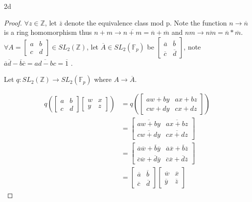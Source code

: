 \documentclass{article}
\newcommand{\Z}{\mathbb{Z}}
\newcommand{\F}{\mathbb{F}}
\begin{document}
\begin{PROB}{2d}\label{Problem 2d.}
    
\end{PROB}
\begin{proof}
    $\forall z \in \Z$, let $\overline{z}$ denote the equivalence class mod p. Note the function $n \to \overline{n}$ is a ring homomorphism thus $n + m \to \overline{n + m} = \overline{n} + \overline{m}$ and $nm \to \overline{nm} = \overline{n} * \overline{m}$. $\forall A = \begin{bmatrix}
        a & b \\ c & d
    \end{bmatrix} \in SL_2(\Z)$, let $\overline{A} \in SL_2(\F_p)$ be $\begin{bmatrix}
        \overline{a} & \overline{b} \\ \overline{c} & \overline{d}
    \end{bmatrix}$, note $\overline{a}\overline{d} - \overline{b}\overline{c} = \overline{ad-bc} = \overline{1}$ . 
    
    Let $q: SL_2(\Z) \to SL_2(\F_p)$ where $A \to \overline{A}$. 
    
    \begin{align*}
        q\left(\begin{bmatrix}
            a & b \\ c & d
        \end{bmatrix} \begin{bmatrix}
            w & x \\ y & z
        \end{bmatrix}\right) &= q\left(\begin{bmatrix}
            aw + by & ax + bz \\ cw + dy & cx + dz
        \end{bmatrix}\right) \\
        &= \begin{bmatrix}
            \overline{aw + by} & \overline{ax + bz} \\ \overline{cw + dy} & \overline{cx + dz}
        \end{bmatrix} \\
        &= \begin{bmatrix}
            \overline{a}\overline{w} + \overline{b}\overline{y} & \overline{a}\overline{x} + \overline{b}\overline{z} \\ \overline{c}\overline{w} + \overline{d}\overline{y} & \overline{c}\overline{x} + \overline{d}\overline{z}
        \end{bmatrix} \\
        &= \begin{bmatrix}
            \overline{a} & \overline{b} \\ \overline{c} & \overline{d}
        \end{bmatrix}\begin{bmatrix}
            \overline{w} & \overline{x} \\ \overline{y} & \overline{z}
        \end{bmatrix}
    \end{align*}


\end{proof}
\end{document}
